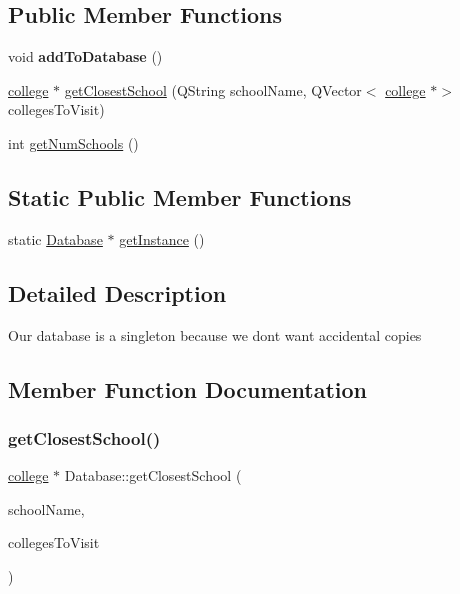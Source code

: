 \subsection*{Public Member Functions}
\begin{DoxyCompactItemize}
\item 
\mbox{\label{class_database_a76a9b0363174bdd6c70a052a088cfaf8}} 
void {\bfseries add\+To\+Database} ()
\item 
\hyperlink{classcollege}{college} $\ast$ \hyperlink{class_database_affe7eb5c35db111e3ff7dc752f5a6c38}{get\+Closest\+School} (Q\+String school\+Name, Q\+Vector$<$ \hyperlink{classcollege}{college} $\ast$$>$ colleges\+To\+Visit)
\item 
int \hyperlink{class_database_aa5d167b5300b715844a760ed9d7e223f}{get\+Num\+Schools} ()
\end{DoxyCompactItemize}
\subsection*{Static Public Member Functions}
\begin{DoxyCompactItemize}
\item 
static \hyperlink{class_database}{Database} $\ast$ \hyperlink{class_database_a5a3b028f980a577ea0b809eb92312761}{get\+Instance} ()
\end{DoxyCompactItemize}


\subsection{Detailed Description}
Our database is a singleton because we dont want accidental copies 

\subsection{Member Function Documentation}
\mbox{\label{class_database_affe7eb5c35db111e3ff7dc752f5a6c38}} 
\subsubsection{\texorpdfstring{get\+Closest\+School()}{getClosestSchool()}}
{\footnotesize\ttfamily \hyperlink{classcollege}{college} $\ast$ Database\+::get\+Closest\+School (\begin{DoxyParamCaption}\item[{Q\+String}]{school\+Name,  }\item[{Q\+Vector$<$ \hyperlink{classcollege}{college} $\ast$$>$}]{colleges\+To\+Visit }\end{DoxyParamCaption})}


